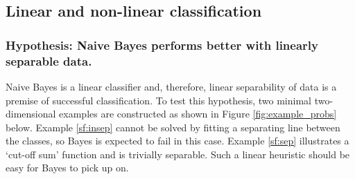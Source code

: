 \documentclass[12pt,notitlepage,twoside]{scrbook}
\begin{document}
\subsection{Linear and non-linear classification}
\subsubsection*{Hypothesis: Naive Bayes performs better with linearly separable data.}

Naive Bayes is a linear classifier and, therefore, linear separability of data is a
premise of successful classification. To test this hypothesis, two minimal two-dimensional
examples are constructed as shown in Figure \ref{fig:example_probs} below.
Example \ref{sf:insep} cannot be solved by fitting a separating line between the
classes, so Bayes is expected to fail in this case. Example \ref{sf:sep} illustrates a
`cut-off sum' function and is trivially separable. Such a linear heuristic should be easy
for Bayes to pick up on.
\end{document}
